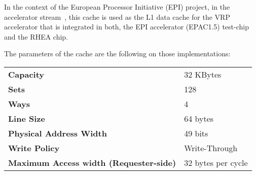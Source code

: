 \documentclass[10pt,titlepage,twoside]{book}
\begin{document}
In the context of the European Processor Initiative (EPI) project, in the accelerator stream~\cite{epac_website_2022}, this cache is used as the L1 data cache for the VRP~\cite{durand_vrp_2022} accelerator that is integrated in both, the EPI accelerator (EPAC1.5) test-chip and the RHEA chip.

The parameters of the cache are the following on those implementations:

\begin{tabular}{ll}
  \textbf{Capacity}
  & 32 KBytes \\
  \textbf{Sets}
  & 128 \\
  \textbf{Ways}
  & 4 \\
  \textbf{Line Size}
  & 64 bytes \\
  \textbf{Physical Address Width}
  & 49 bits \\
  \textbf{Write Policy}
  & Write-Through \\
  \textbf{Maximum Access width (Requester-side)}
  & 32 bytes per cycle \\
\end{tabular}

%
%
\printbibliography
\end{document}
